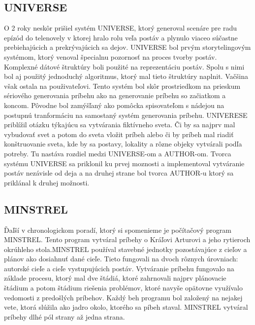 \subsection{UNIVERSE}
O 2 roky neskôr prišiel systém UNIVERSE, ktorý generoval scenáre pre radu epízód do telenovely v ktorej hralo rolu veľa postáv a plynulo viaceo súčastne prebiehajúcich a prekrývajúcich sa dejov. UNIVERSE bol prvým storytelingovým systémom, ktorý venoval špecialnu pozornosť na proces tvorby postáv. Komplexné dátové štruktúry boli použité na reprezentáciu postáv. Spolu s nimi bol aj použitý jednoduchý algoritmus, ktorý mal tieto štruktúry naplnit. Vačšina však ostala na použivateľovi. Tento systém bol skôr prostriedkom na prieskum sériového generovania príbehu ako na generovanie príbehu so začiatkom a koncom. Pôvodne bol zamýšľaný ako pomôcka spisovateľom s nádejou na postupnú tranformáciu na samostaný systém generovania príbehu. UNIVERESE priblížil otázku týkajúcu sa vytvárania fiktívneho sveta. Či by sa najprv mal vybudovať svet a potom do sveta vložit príbeh alebo či by príbeh mal riadiť konštruovanie sveta, kde by sa postavy, lokality a rôzne objeky vytvárali podľa potreby. Tu nastáva rozdiel medzi UNIVERSE-om a AUTHOR-om. Tvorca systému UNIVERSE sa priklonil ku prvej moznosti a implementoval vytváranie postáv nezávisle od deja a na druhej strane bol tvorca AUTHOR-u ktorý sa priklánal k druhej možnosti.\par
\subsection{MINSTREL}
Ďaľší v chronologickom poradí, ktorý si spomenieme je počítačový program MINSTREL. Tento program vytváral príbehy o Kráľovi Arturovi a jeho rytieroch okrúhleho stola.MINSTREL používal stavebné jednotky pozostávajúce z cieľov a plánov ako dosiahnuť dané cieľe. Tieto fungovali na dvoch rôznych úrovniach: autorské cieľe a cieľe vystupujúcich postáv. Vytváranie príbehu fungovalo na základe procesu, ktorý mal dve štádiá, ktoré zahrnovali najprv plánovacie štádium a potom štádium riešenia problémov, ktoré navyše opätovne využívalo vedomosti z predošlých príbehov. Každý beh programu bol založený na nejakej vete, ktorá slúžila ako jadro okolo, ktorého sa píbeh staval.  MINSTREL vytváral príbehy dlhé pól strany až jedna strana.\par
